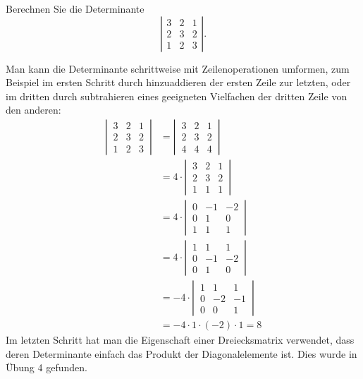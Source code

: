 Berechnen Sie die Determinante
\[
\left|\begin{matrix}
3&2&1\\
2&3&2\\
1&2&3
\end{matrix}\right|
.
\]

\begin{loesung}
Man kann die Determinante schrittweise mit Zeilenoperationen umformen,
zum Beispiel im ersten Schritt durch hinzuaddieren der ersten Zeile
zur letzten, oder im dritten durch subtrahieren eines geeigneten
Vielfachen der dritten Zeile von den anderen:
\begin{align*}
\left|\,\begin{matrix}
3&2&1\\
2&3&2\\
1&2&3
\end{matrix}\,\right|
&=
\left|\,\begin{matrix}
3&2&1\\
2&3&2\\
4&4&4
\end{matrix}\,\right|
\\&=
4\cdot \left|\,\begin{matrix}
3&2&1\\
2&3&2\\
1&1&1
\end{matrix}\,\right|
\\&=
4\cdot \left|\,\begin{matrix}
0&-1&-2\\
0& 1& 0\\
1& 1& 1
\end{matrix}\,\right|
\\&=
4\cdot \left|\,\begin{matrix}
1& 1& 1\\
0&-1&-2\\
0& 1& 0
\end{matrix}\,\right|
\\&=
-4\cdot \left|\,\begin{matrix}
1& 1& 1\\
0&-2&-1\\
0& 0& 1
\end{matrix}\,\right|
\\&=
-4\cdot 1\cdot (-2)\cdot 1=8
\end{align*}
Im letzten Schritt hat man die Eigenschaft einer Dreiecksmatrix verwendet,
dass deren Determinante einfach das Produkt der Diagonalelemente ist.
Dies wurde in \"Ubung 4 gefunden.
\end{loesung}
